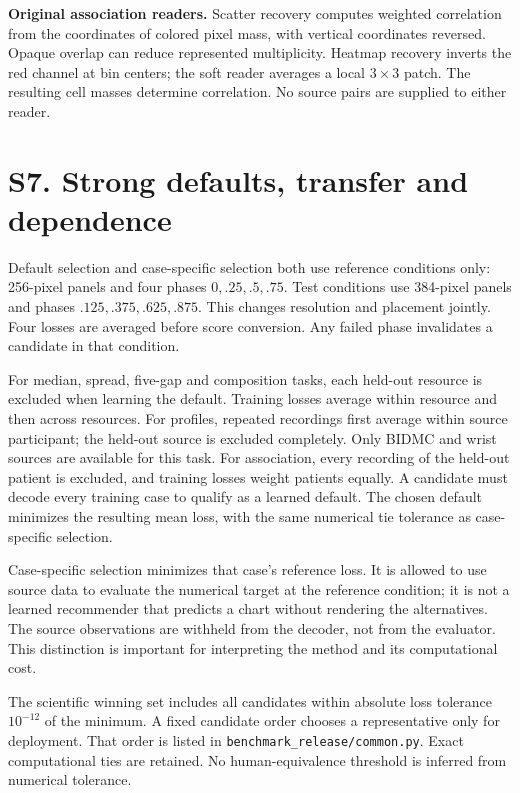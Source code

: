 \documentclass[10pt]{article}
\begin{document}
\textbf{Original association readers.} Scatter recovery computes weighted correlation from the coordinates of colored pixel mass, with vertical coordinates reversed. Opaque overlap can reduce represented multiplicity. Heatmap recovery inverts the red channel at bin centers; the soft reader averages a local $3\times3$ patch. The resulting cell masses determine correlation. No source pairs are supplied to either reader.

\section*{S7. Strong defaults, transfer and dependence}
Default selection and case-specific selection both use reference conditions only: 256-pixel panels and four phases $0,.25,.5,.75$. Test conditions use 384-pixel panels and phases $.125,.375,.625,.875$. This changes resolution and placement jointly. Four losses are averaged before score conversion. Any failed phase invalidates a candidate in that condition.

For median, spread, five-gap and composition tasks, each held-out resource is excluded when learning the default. Training losses average within resource and then across resources. For profiles, repeated recordings first average within source participant; the held-out source is excluded completely. Only BIDMC and wrist sources are available for this task. For association, every recording of the held-out patient is excluded, and training losses weight patients equally. A candidate must decode every training case to qualify as a learned default. The chosen default minimizes the resulting mean loss, with the same numerical tie tolerance as case-specific selection.

Case-specific selection minimizes that case's reference loss. It is allowed to use source data to evaluate the numerical target at the reference condition; it is not a learned recommender that predicts a chart without rendering the alternatives. The source observations are withheld from the decoder, not from the evaluator. This distinction is important for interpreting the method and its computational cost.

The scientific winning set includes all candidates within absolute loss tolerance $10^{-12}$ of the minimum. A fixed candidate order chooses a representative only for deployment. That order is listed in \texttt{benchmark\_release/common.py}. Exact computational ties are retained. No human-equivalence threshold is inferred from numerical tolerance.
\end{document}
